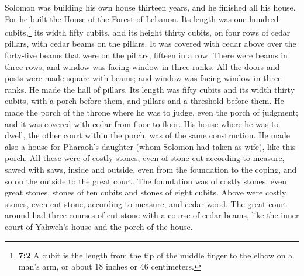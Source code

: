  Solomon was building his own house thirteen years, and he
finished all his house.  For he built the House of the
Forest of Lebanon. Its length was one hundred cubits,\footnote{\textbf{7:2}
  A cubit is the length from the tip of the middle finger to the elbow
  on a man's arm, or about 18 inches or 46 centimeters.} its width fifty
cubits, and its height thirty cubits, on four rows of cedar pillars,
with cedar beams on the pillars.  It was covered with
cedar above over the forty-five beams that were on the pillars, fifteen
in a row.  There were beams in three rows, and window was
facing window in three ranks.  All the doors and posts
were made square with beams; and window was facing window in three
ranks.  He made the hall of pillars. Its length was fifty
cubits and its width thirty cubits, with a porch before them, and
pillars and a threshold before them.  He made the porch of
the throne where he was to judge, even the porch of judgment; and it was
covered with cedar from floor to floor.  His house where
he was to dwell, the other court within the porch, was of the same
construction. He made also a house for Pharaoh's daughter (whom Solomon
had taken as wife), like this porch.  All these were of
costly stones, even of stone cut according to measure, sawed with saws,
inside and outside, even from the foundation to the coping, and so on
the outside to the great court.  The foundation was of
costly stones, even great stones, stones of ten cubits and stones of
eight cubits.  Above were costly stones, even cut stone,
according to measure, and cedar wood.  The great court
around had three courses of cut stone with a course of cedar beams, like
the inner court of Yahweh's house and the porch of the house.

